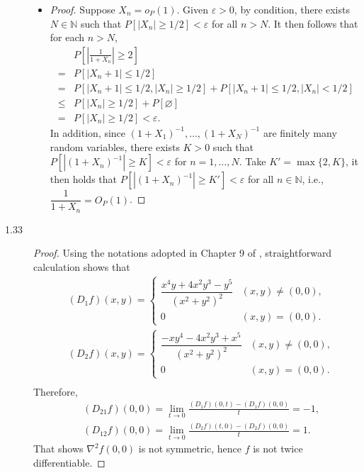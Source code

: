 \documentclass{article}
\newcommand{\eps}{\varepsilon}
\newcommand{\nn}{\mathbb{N}}
\theoremstyle{definition}
\theoremstyle{plain}
\theoremstyle{remark}
\begin{document}
\begin{description}
\begin{itemize}
\item 
\begin{proof}
Suppose $X_n = o_P(1)$. Given $\eps > 0$, by condition, there exists $N \in \nn$ such that $P[|X_n| \geq 1/2] < \eps$ for all $n > N$. It then follows that for each $n > N$, 
\begin{align*}
& P\left[\left|\frac{1}{1 + X_n}\right| \geq 2\right] \\
= & P[|X_n + 1| \leq 1/2] \\
= & P[|X_n + 1| \leq 1/2, |X_n| \geq 1/2] + P[|X_n + 1| \leq 1/2, |X_n| < 1/2] \\
\leq & P[|X_n| \geq 1/2] + P[\varnothing] \\
= & P[|X_n| \geq 1/2]  < \eps. 
\end{align*}
In addition, since $(1 + X_1)^{-1}, \ldots, (1 + X_N)^{-1}$ are finitely many random variables, there exists $K > 0$ such that $P[|(1 + X_n)^{-1}| \geq K] < \eps$ for $n = 1, \ldots, N$. Take $K' = \max\{2, K\}$, it then holds that $P[|(1 + X_n)^{-1}| \geq K'] < \eps$ for all $n \in \nn$, i.e., $\dfrac{1}{1 + X_n} = O_P(1)$.
\end{proof}
\end{itemize}

\item[1.33]
\begin{proof}
Using the notations adopted in Chapter 9 of \cite{rudin1964}, straightforward 
calculation shows that
\begin{align*}
    & (D_1 f)(x, y) = \begin{cases}
    \dfrac{x^4 y + 4x^2y^3 - y^5}{(x^2 + y^2)^2} & (x, y) \neq (0, 0), \\
    0 & (x, y) = (0, 0).
    \end{cases} \\
    & (D_2 f)(x, y) = \begin{cases}
    \dfrac{-xy^4 - 4x^2y^3 + x^5}{(x^2 + y^2)^2} & (x, y) \neq (0, 0), \\
    0 & (x, y) = (0, 0).
    \end{cases} \\
\end{align*}
Therefore,
\begin{align*}
   & (D_{21} f)(0, 0) = \lim_{t \to 0} \frac{(D_1 f)(0, t) - (D_1 f)(0, 0)}{t} = -1,
    \\
   & (D_{12} f)(0, 0) = \lim_{t \to 0} \frac{(D_2 f)(t, 0) - (D_2 f)(0, 0)}{t} = 1.
\end{align*}
That shows $\nabla^2 f (0, 0)$ is not symmetric, hence $f$ is not 
twice differentiable.
\end{proof}


\end{description}
\end{document}
